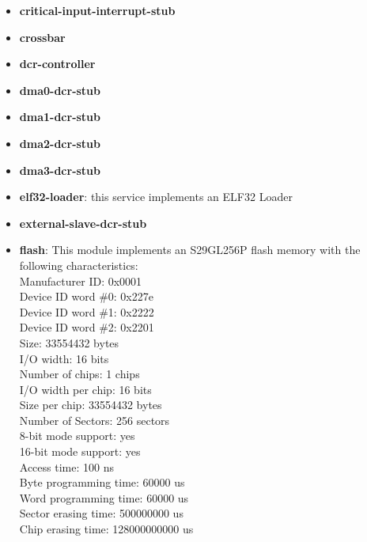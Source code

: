 \begin{itemize}
\item \textbf{critical-input-interrupt-stub}
\item \textbf{crossbar}
\item \textbf{dcr-controller}
\item \textbf{dma0-dcr-stub}
\item \textbf{dma1-dcr-stub}
\item \textbf{dma2-dcr-stub}
\item \textbf{dma3-dcr-stub}
\item \textbf{elf32-loader}: this service implements an ELF32 Loader
\item \textbf{external-slave-dcr-stub}
\item \textbf{flash}: This module implements an S29GL256P flash memory with the following characteristics:\\
Manufacturer ID: 0x0001\\
Device ID word \#0: 0x227e\\
Device ID word \#1: 0x2222\\
Device ID word \#2: 0x2201\\
Size: 33554432 bytes\\
I/O width: 16 bits\\
Number of chips: 1 chips\\
I/O width per chip: 16 bits\\
Size per chip: 33554432 bytes\\
Number of Sectors: 256 sectors\\
8-bit mode support: yes\\
16-bit mode support: yes\\
Access time: 100 ns\\
Byte programming time: 60000 us\\
Word programming time: 60000 us\\
Sector erasing time: 500000000 us\\
Chip erasing time: 128000000000 us\\


\end{itemize}
